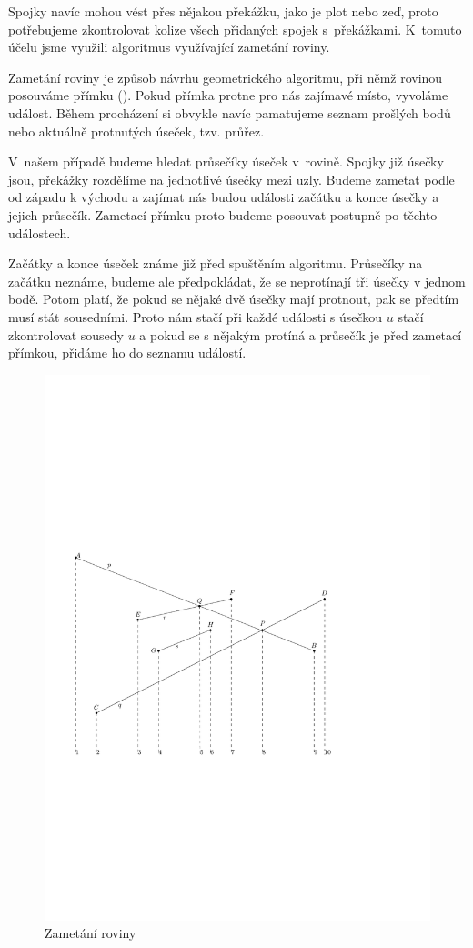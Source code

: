 Spojky navíc mohou vést přes nějakou překážku, jako je plot nebo zeď, proto
potřebujeme zkontrolovat kolize všech přidaných spojek s~překážkami. K~tomuto
účelu jsme využili algoritmus využívající zametání roviny.


{\tuc Zametání roviny} \cite{zametani} je způsob návrhu geometrického algoritmu,
při němž rovinou posouváme přímku (). Pokud přímka protne pro nás
zajímavé místo, vyvoláme událost. Během procházení si obvykle navíc pamatujeme
seznam prošlých bodů nebo aktuálně protnutých úseček, tzv. {\tuc průřez}.

V~našem případě budeme hledat průsečíky úseček v~rovině. Spojky již úsečky jsou,
překážky rozdělíme na jednotlivé úsečky mezi uzly. Budeme zametat podle od
západu k východu a zajímat nás budou události začátku a konce úsečky a jejich
průsečík. Zametací přímku proto budeme posouvat postupně po těchto událostech.

Začátky a konce úseček známe již před spuštěním algoritmu. Průsečíky na začátku
neznáme, budeme ale předpokládat, že se neprotínají tři úsečky v jednom bodě.
Potom platí, že pokud se nějaké dvě úsečky mají protnout, pak se předtím musí
stát sousedními. Proto nám stačí při každé události s úsečkou $u$ stačí
zkontrolovat sousedy $u$ a pokud se s nějakým protíná a průsečík je před
zametací přímkou, přidáme ho do seznamu událostí.

\begin{figure}[h]
	\centering
	\includegraphics{../img/zametani.pdf}
	\caption{Zametání roviny}
	\label{fig:zametani}
\end{figure}

